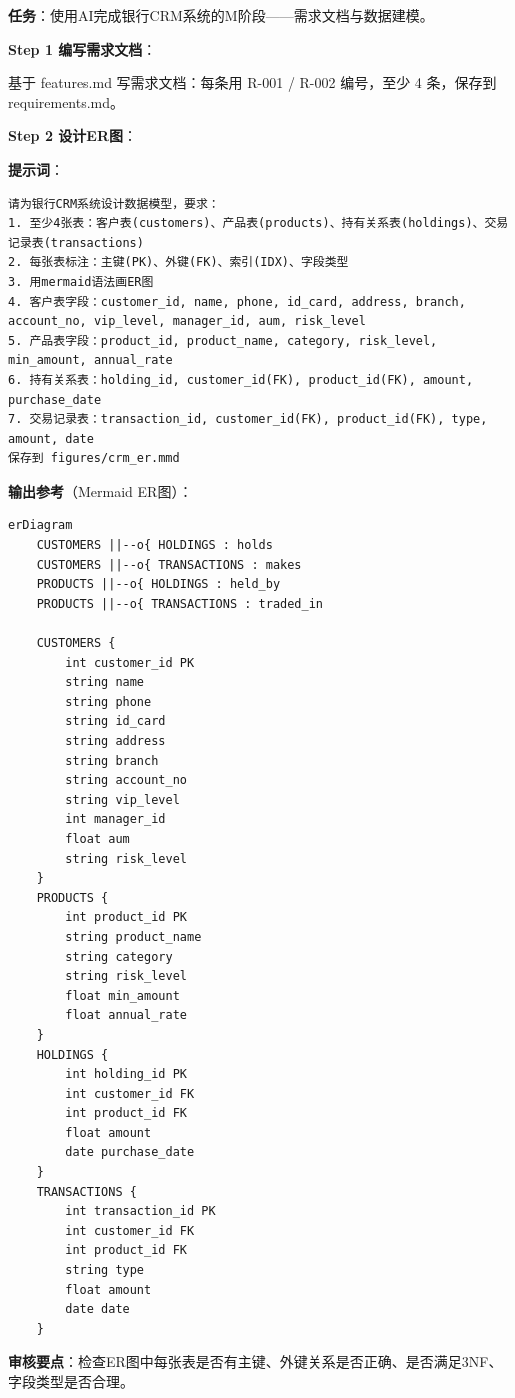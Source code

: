 \begin{practicebox}[用AI设计CRM数据模型]
\textbf{任务}：使用AI完成银行CRM系统的M阶段——需求文档与数据建模。

\textbf{Step 1 编写需求文档}：

基于 features.md 写需求文档：每条用 R-001 / R-002 编号，至少 4 条，保存到 requirements.md。

\textbf{Step 2 设计ER图}：

\textbf{提示词}：

\begin{lstlisting}
请为银行CRM系统设计数据模型，要求：
1. 至少4张表：客户表(customers)、产品表(products)、持有关系表(holdings)、交易记录表(transactions)
2. 每张表标注：主键(PK)、外键(FK)、索引(IDX)、字段类型
3. 用mermaid语法画ER图
4. 客户表字段：customer_id, name, phone, id_card, address, branch, account_no, vip_level, manager_id, aum, risk_level
5. 产品表字段：product_id, product_name, category, risk_level, min_amount, annual_rate
6. 持有关系表：holding_id, customer_id(FK), product_id(FK), amount, purchase_date
7. 交易记录表：transaction_id, customer_id(FK), product_id(FK), type, amount, date
保存到 figures/crm_er.mmd
\end{lstlisting}

\textbf{输出参考}（Mermaid ER图）：

\begin{lstlisting}
erDiagram
    CUSTOMERS ||--o{ HOLDINGS : holds
    CUSTOMERS ||--o{ TRANSACTIONS : makes
    PRODUCTS ||--o{ HOLDINGS : held_by
    PRODUCTS ||--o{ TRANSACTIONS : traded_in

    CUSTOMERS {
        int customer_id PK
        string name
        string phone
        string id_card
        string address
        string branch
        string account_no
        string vip_level
        int manager_id
        float aum
        string risk_level
    }
    PRODUCTS {
        int product_id PK
        string product_name
        string category
        string risk_level
        float min_amount
        float annual_rate
    }
    HOLDINGS {
        int holding_id PK
        int customer_id FK
        int product_id FK
        float amount
        date purchase_date
    }
    TRANSACTIONS {
        int transaction_id PK
        int customer_id FK
        int product_id FK
        string type
        float amount
        date date
    }
\end{lstlisting}

\textbf{审核要点}：检查ER图中每张表是否有主键、外键关系是否正确、是否满足3NF、字段类型是否合理。
\end{practicebox}

